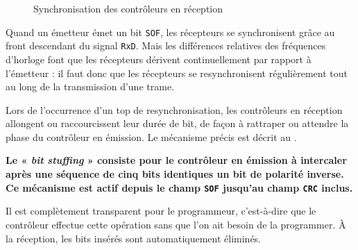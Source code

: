 \begin{figure}[h]
  \centering
  \caption{Synchronisation des contrôleurs en réception}
\end{figure}

Quand un émetteur émet un bit \texttt{SOF}, les récepteurs se synchronisent grâce au front descendant du signal \texttt{RxD}. Mais les différences relatives des fréquences d'horloge font que les récepteurs dérivent continuellement par rapport à l'émetteur : il faut donc que les récepteurs se resynchronisent régulièrement tout au long de la transmission d'une trame.

Lors de l'occurrence d'un top de resynchronisation, les contrôleurs en réception allongent ou raccourcissent leur durée de bit, de façon à rattraper ou attendre la phase du contrôleur en émission. Le mécanisme précis est décrit au .












{\bf Le « \emph{bit stuffing} » consiste pour le contrôleur en émission à intercaler après une séquence de cinq bits identiques un bit de polarité inverse. Ce mécanisme est actif depuis le champ \texttt{SOF} jusqu'au champ \texttt{CRC} inclus.}

Il est complètement transparent pour le programmeur, c'est-à-dire que le contrôleur effectue cette opération sans que l'on ait besoin de la programmer. À la réception, les bits insérés sont automatiquement éliminés.

